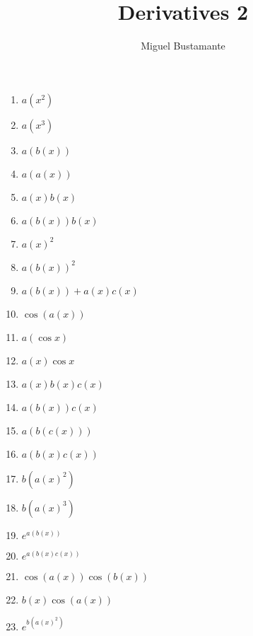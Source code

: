 \documentclass{article}
\title{Derivatives 2}
\author{Miguel Bustamante}
\begin{document}
\maketitle
\begin{multicols}{3}
\begin{enumerate}
    \item $a(x^2)$
    \item $a(x^3)$
    \item $a(b(x))$
    \item $a(a(x))$
    \item $a(x)b(x)$
    \item $a(b(x))b(x)$
    \item $a(x)^2$
    \item $a(b(x))^2$
    \item $a(b(x))+a(x)c(x)$
    \item $\cos(a(x))$
    \item $a(\cos x)$
    \item $a(x)\cos x$
    \item $a(x)b(x)c(x)$
    \item $a(b(x))c(x)$
    \item $a(b(c(x)))$
    \item $a(b(x)c(x))$
    \item $b(a(x)^2)$
    \item $b(a(x)^3)$
    \item $e^{a(b(x))}$
    \item $e^{a(b(x)c(x))}$
    \item $\cos(a(x))\cos(b(x))$
    \item $b(x)\cos(a(x))$
    \item $e^{b(a(x)^2)}$
\end{enumerate} 
\end{multicols}
\end{document}
